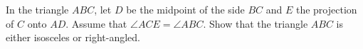 In the triangle $ABC$, let $D$ be the midpoint of the side $BC$ and $E$ the projection of $C$ onto $AD$.
Assume that $\angle ACE = \angle ABC$. Show that the triangle $ABC$ is either isosceles or right-angled.